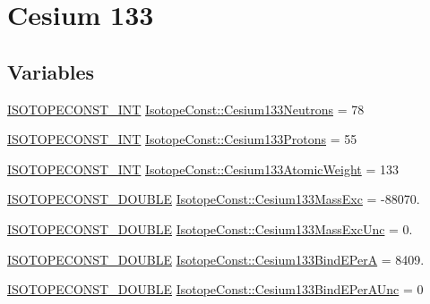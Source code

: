 \hypertarget{group___isotope_const-_cesium-_cs133}{}\section{Cesium 133}
\label{group___isotope_const-_cesium-_cs133}
\subsection*{Variables}
\begin{DoxyCompactItemize}
\item 
\mbox{\hyperlink{group___isotope_const-_macros_ga5f18360b3e99483a35c32d789e62621c}{I\+S\+O\+T\+O\+P\+E\+C\+O\+N\+S\+T\+\_\+\+I\+NT}} \mbox{\hyperlink{group___isotope_const-_cesium-_cs133_gaf09aa83a497f52f343cacd3935fcdf94}{Isotope\+Const\+::\+Cesium133\+Neutrons}} = 78
\item 
\mbox{\hyperlink{group___isotope_const-_macros_ga5f18360b3e99483a35c32d789e62621c}{I\+S\+O\+T\+O\+P\+E\+C\+O\+N\+S\+T\+\_\+\+I\+NT}} \mbox{\hyperlink{group___isotope_const-_cesium-_cs133_ga757c0f9e3615c840bc46a9fb5a60d92c}{Isotope\+Const\+::\+Cesium133\+Protons}} = 55
\item 
\mbox{\hyperlink{group___isotope_const-_macros_ga5f18360b3e99483a35c32d789e62621c}{I\+S\+O\+T\+O\+P\+E\+C\+O\+N\+S\+T\+\_\+\+I\+NT}} \mbox{\hyperlink{group___isotope_const-_cesium-_cs133_ga2f0b5675b799982e2e2af94427a375ea}{Isotope\+Const\+::\+Cesium133\+Atomic\+Weight}} = 133
\item 
\mbox{\hyperlink{group___isotope_const-_macros_ga8f45a7272ce02c0b4c65c44636ed719a}{I\+S\+O\+T\+O\+P\+E\+C\+O\+N\+S\+T\+\_\+\+D\+O\+U\+B\+LE}} \mbox{\hyperlink{group___isotope_const-_cesium-_cs133_ga8c3c6ea44feedf58e22e2d443b43b06f}{Isotope\+Const\+::\+Cesium133\+Mass\+Exc}} = -\/88070.
\item 
\mbox{\hyperlink{group___isotope_const-_macros_ga8f45a7272ce02c0b4c65c44636ed719a}{I\+S\+O\+T\+O\+P\+E\+C\+O\+N\+S\+T\+\_\+\+D\+O\+U\+B\+LE}} \mbox{\hyperlink{group___isotope_const-_cesium-_cs133_ga7b3b7690062fc485d40795eb5458ddce}{Isotope\+Const\+::\+Cesium133\+Mass\+Exc\+Unc}} = 0.
\item 
\mbox{\hyperlink{group___isotope_const-_macros_ga8f45a7272ce02c0b4c65c44636ed719a}{I\+S\+O\+T\+O\+P\+E\+C\+O\+N\+S\+T\+\_\+\+D\+O\+U\+B\+LE}} \mbox{\hyperlink{group___isotope_const-_cesium-_cs133_ga3137b8cf3e13d4685f6774e536ed085b}{Isotope\+Const\+::\+Cesium133\+Bind\+E\+PerA}} = 8409.
\item 
\mbox{\hyperlink{group___isotope_const-_macros_ga8f45a7272ce02c0b4c65c44636ed719a}{I\+S\+O\+T\+O\+P\+E\+C\+O\+N\+S\+T\+\_\+\+D\+O\+U\+B\+LE}} \mbox{\hyperlink{group___isotope_const-_cesium-_cs133_gaf174e1e683d1dafc6078f45c59cb69a0}{Isotope\+Const\+::\+Cesium133\+Bind\+E\+Per\+A\+Unc}} = 0

\end{DoxyCompactItemize}
